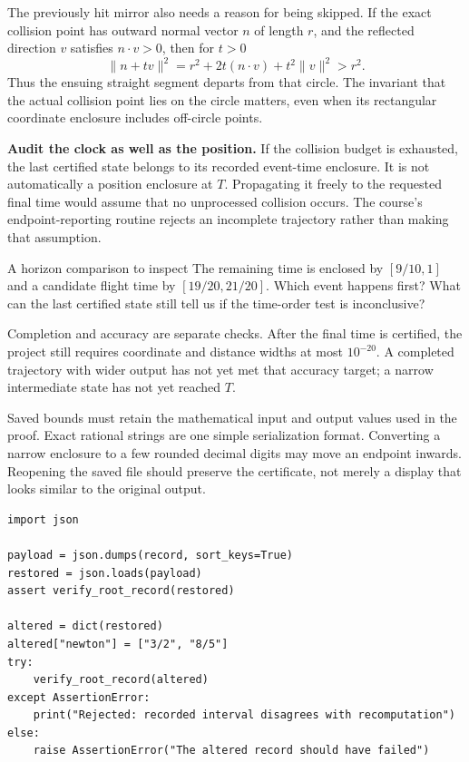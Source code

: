 The previously hit mirror also needs a reason for being skipped. If the
exact collision point has outward normal vector $n$ of length $r$, and
the reflected direction $v$ satisfies $n\cdot v>0$, then for $t>0$
\[
            \|n+tv\|^2=r^2+2t(n\cdot v)+t^2\|v\|^2>r^2.
\]
Thus the ensuing straight segment departs from that circle. The invariant
that the actual collision point lies on the circle matters, even when its
rectangular coordinate enclosure includes off-circle points.

\textbf{Audit the clock as well as the position.} If the collision budget
is exhausted, the last certified state belongs to its recorded event-time
enclosure. It is not automatically a position enclosure at $T$. Propagating
it freely to the requested final time would assume that no unprocessed
collision occurs. The course's endpoint-reporting routine rejects an
incomplete trajectory rather than making that assumption.

\begin{question}{A horizon comparison to inspect}
The remaining time is enclosed by $[9/10,1]$ and a candidate flight time
by $[19/20,21/20]$. Which event happens first? What can the last certified
state still tell us if the time-order test is inconclusive?
\end{question}

Completion and accuracy are separate checks. After the final time is
certified, the project still requires coordinate and distance widths at
most $10^{-20}$. A completed trajectory with wider output has not yet met
that accuracy target; a narrow intermediate state has not yet reached $T$.

\newpage
{}
Saved bounds must retain the mathematical input and output values used in
the proof. Exact rational strings are one simple serialization format.
Converting a narrow enclosure to a few rounded decimal digits may move an
endpoint inwards. Reopening the saved file should preserve the certificate,
not merely a display that looks similar to the original output.
\begin{lstlisting}
import json

payload = json.dumps(record, sort_keys=True)
restored = json.loads(payload)
assert verify_root_record(restored)

altered = dict(restored)
altered["newton"] = ["3/2", "8/5"]
try:
    verify_root_record(altered)
except AssertionError:
    print("Rejected: recorded interval disagrees with recomputation")
else:
    raise AssertionError("The altered record should have failed")
\end{lstlisting}

